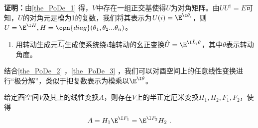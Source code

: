 \textbf{证明：}由\autoref{the_PoDe_1} 得，$V$中存在一组正交基使得$U$为对角矩阵。由$UU^{\dagger}=E$可知，$U$的对角元是模为1的复数，我们将其表示为$U(i)=\E^{\I\theta_i}$，则$U=\E^{\I H},H=\opn{diag}(\theta_1,\theta_2...\theta_n)$。
\begin{example}{}
\begin{enumerate}
\item 用转动生成元$\hat{L_i}$生成使系统绕$i$轴转动的幺正变换$\hat U=\E^{\I\hat{L}_i\theta}$，其中$\theta$表示转动角度。
\end{enumerate}
\end{example}
结合\autoref{the_PoDe_2} ，\autoref{the_PoDe_3} ，我们可以对酉空间上的任意线性变换进行“极分解”，类似于把复数表示为模乘以$\E^{\I\theta}$。
\begin{corollary}{}
给定酉空间$V$及其上的线性变换$A$，则存在$V$上的半正定厄米变换$H_1,H_2,F_1,F_2$，使得
\begin{equation}
A=H_1\E^{\I F_1}=\E^{\I F_2}H_2~.
\end{equation}
\end{corollary}
